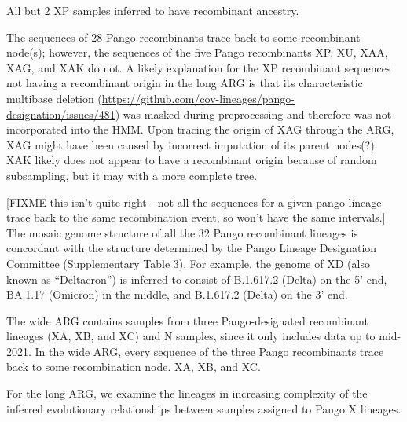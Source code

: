 \documentclass{article}
\begin{document}
All but 2 XP samples inferred to have recombinant ancestry.

The sequences of 28 Pango recombinants trace back
to some recombinant node(s); however, the sequences of the five Pango
recombinants XP, XU, XAA, XAG, and XAK do not.
A likely explanation for the XP
recombinant sequences not having a recombinant origin in the long ARG is that
its characteristic multibase deletion
(\url{https://github.com/cov-lineages/pango-designation/issues/481}) was masked
during preprocessing and therefore was not incorporated into the HMM.
Upon tracing the origin of XAG through the ARG, XAG might have been caused by
incorrect imputation of its parent nodes(?). XAK likely does not appear to have
a recombinant origin because of random subsampling, but it may with a more
complete tree.

[FIXME this isn't quite right - not all the sequences for a given pango
lineage trace back to the same recombination event, so won't have the same
intervals.]
The mosaic genome structure of all the 32 Pango recombinant lineages is concordant with
the structure determined by the Pango Lineage Designation Committee
(Supplementary Table 3). For example, the genome of XD (also known as
``Deltacron'') is inferred to consist of B.1.617.2 (Delta) on the 5’ end, BA.1.17
(Omicron) in the middle, and B.1.617.2 (Delta) on the 3’ end.

The wide ARG contains samples from three Pango-designated recombinant
lineages (XA, XB, and XC) and N samples, since it only includes data
up to mid-2021.
In the wide ARG, every sequence of the three Pango recombinants trace back to
some recombination node. XA, XB, and XC.

For the long ARG, we examine the lineages in increasing complexity of the
inferred evolutionary relationships between samples assigned to Pango
X lineages.



\end{document}
